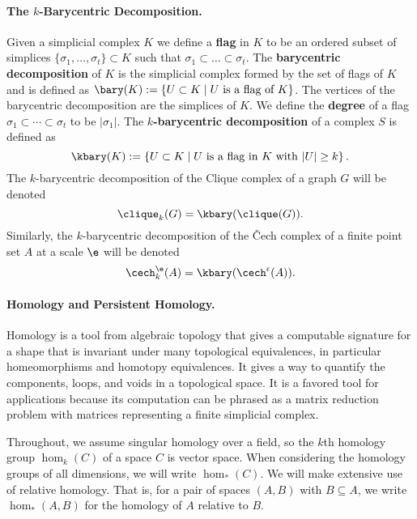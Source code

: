 \paragraph*{\textbf{The $k$-Barycentric Decomposition.}} %
    Given a simplicial complex $K$ we define a \textbf{flag} in $K$ to be an ordered subset of simplices $\{\sigma_1,\ldots,\sigma_t\}\subset K$ such that $\sigma_1\subset\ldots\subset\sigma_t$.
    The \textbf{barycentric decomposition} of $K$ is the simplicial complex formed by the set of flags of $K$ and is defined as $\bary(K):= \left\{U\subset K\mid U\text{ is a flag of } K\right\}$.
    The vertices of the barycentric decomposition are the simplices of $K$.
    We define the \textbf{degree} of a flag $\sigma_1\subset \cdots \subset \sigma_t$ to be $|\sigma_1|$.
    The \textbf{$k$-barycentric decomposition} of a complex $S$ is defined as
    \[
      \kbary(K) := \left\{U\subset K\mid U\text{ is a flag in $K$ with } |U|\geq k\right\}.
    \]
    The $k$-barycentric decomposition of the Clique complex of a graph $G$ will be denoted
    \[
      \clique_k(G) = \kbary(\clique(G)).
    \]
    Similarly, the $k$-barycentric decomposition of the \v Cech complex of a finite point set $A$ at a scale $\e$ will be denoted
    \[
      \cech_k^\e(A) = \kbary(\cech^\epsilon(A)).
    \]

\paragraph*{\textbf{Homology and Persistent Homology.}} %
\label{par:homology_and_persistent_homology}

    Homology is a tool from algebraic topology that gives a computable signature for a shape that is invariant under many topological equivalences, in particular homeomorphisms and homotopy equivalences.
    It gives a way to quantify the components, loops, and voids in a topological space.
    It is a favored tool for applications because its computation can be phrased as a matrix reduction problem with matrices representing a finite simplicial complex.

    Throughout, we assume singular homology over a field, so the $k$th homology group $\hom_k(C)$ of a space $C$ is vector space.
    When considering the homology groups of all dimensions, we will write $\hom_*(C)$.
    We will make extensive use of relative homology.
    That is, for a pair of spaces $(A,B)$ with $B\subseteq A$, we write $\hom_*(A,B)$ for the homology of $A$ relative to $B$.


